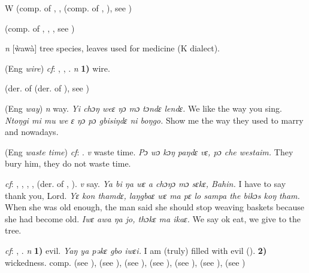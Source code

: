 \begin{letter}{W}
 (comp. of , ,  (comp. of , ), see ) 

 (comp. of , , , see ) 

 \textit{n} [ẁawà] tree species, leaves used for medicine (K dialect). 

 (Eng \textit{wire}) \textit{cf}: , , . \textit{n} \textbf{1)} wire.

 (der. of  (der. of ), see ) 

 (Eng \textit{way}) \textit{n} way. \textit{Yi chɔŋ weɛ ŋɔ mɔ tɔndɛ lendɛ.} We like the way you sing. \textit{Ntoŋgi mi mu we ɛ ŋɔ pɔ gbisiŋdɛ ni boŋgo.} Show me the way they used to marry and nowadays.

 (Eng \textit{waste time}) \textit{cf}: . \textit{v} waste time. \textit{Pɔ wɔ kɔŋ paŋdɛ vɛ, pɔ che westaim.} They bury him, they do not waste time.

 \textit{cf}: , , , ,  (der. of , ). \textit{v} say. \textit{Ya bi ŋa wɛ a chɔŋɔ mɔ sɛkɛ, Bahin.} I have to say thank you, Lord. \textit{Yɛ kon thamdɛ, laŋgbaɛ wɛ ma pɛ lo sampa the bikɔs koŋ tham.} When she was old enough, the man said she should stop weaving baskets because she had become old. \textit{Iwɛ awa ŋa jo, thɔkɛ ma ikaɛ.} We say ok eat, we give to the tree.

 \textit{cf}: , . \textit{n} \textbf{1)} evil. \textit{Yaŋ ya pəkɛ gbo iwɛi.} I am (truly) filled with evil (\citealt{Pichl1967}). \textbf{2)} wickedness. comp.  (see ),  (see ),  (see ),  (see ),  (see ),  (see ),  (see )


\end{letter}
